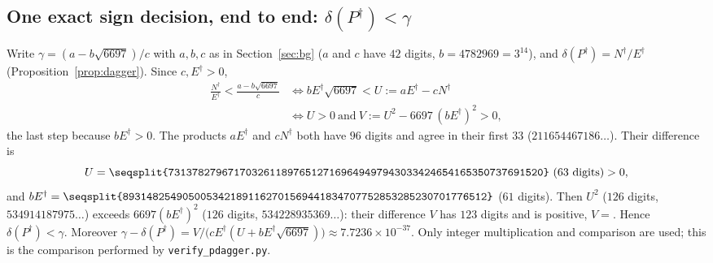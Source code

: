 \documentclass[11pt]{amsart}
\theoremstyle{definition}
\theoremstyle{remark}
\begin{document}
\subsection*{One exact sign decision, end to end: $\delta(P^\dagger)<\gamma$}
Write $\gamma=(a-b\sqrt{6697})/c$ with $a,b,c$ as in Section~\ref{sec:bg} ($a$ and $c$ have $42$ digits, $b=4782969=3^{14}$), and $\delta(P^\dagger)=N^\dagger/E^\dagger$ (Proposition~\ref{prop:dagger}). Since $c,E^\dagger>0$,
\begin{align*}
\frac{N^\dagger}{E^\dagger}<\frac{a-b\sqrt{6697}}{c}
&\iff bE^\dagger\sqrt{6697}<U:=aE^\dagger-cN^\dagger\\
&\iff U>0\ \text{and}\ V:=U^2-6697\,(bE^\dagger)^2>0 ,
\end{align*}
the last step because $bE^\dagger>0$. The products $aE^\dagger$ and $cN^\dagger$ both have $96$ digits and agree in their first $33$ ($211654467186\ldots$). Their difference is
\[
U=\texttt{\seqsplit{731378279671703261189765127169649497943033424654165350737691520}}\ (63\text{ digits})>0 ,
\]
and $bE^\dagger=\texttt{\seqsplit{8931482549050053421891162701569441834707752853285230701776512}}$ ($61$ digits). Then $U^2$ ($126$ digits, $534914187975\ldots$) exceeds $6697(bE^\dagger)^2$ ($126$ digits, $534228935369\ldots$): their difference $V$ has $123$ digits and is positive,
$V={}$\texttt{}. Hence $\delta(P^\dagger)<\gamma$. Moreover $\gamma-\delta(P^\dagger)=V/\bigl(cE^\dagger(U+bE^\dagger\sqrt{6697})\bigr)\approx7.7236\times10^{-37}$. Only integer multiplication and comparison are used; this is the comparison performed by \texttt{verify\_pdagger.py}.
\end{document}
